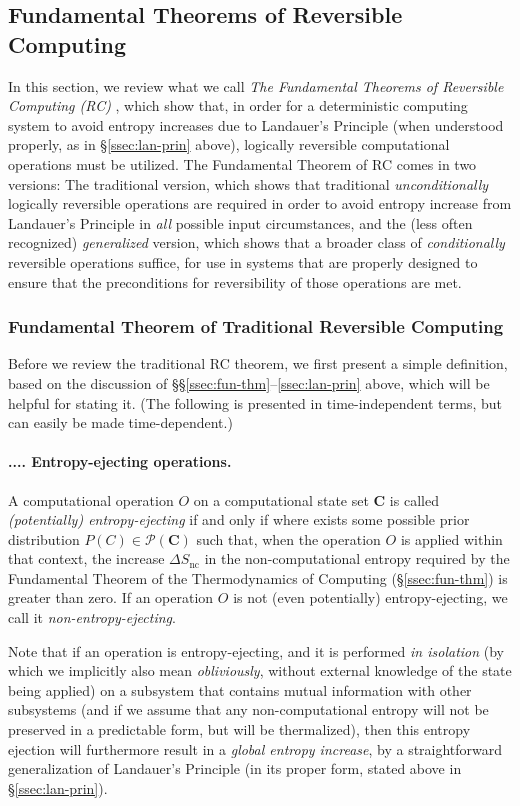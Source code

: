 \documentclass[preprints,article,accept,moreauthors,pdftex]{Definitions/mdpi}
\newcommand{\mypara}[1]{\paragraph{\arabic{section}.\arabic{subsection}.\arabic{subsubsection}.\arabic{paragraph}. #1}}
\begin{document}
\begin{paracol}{2}
\subsection{Fundamental Theorems of Reversible Computing}
\label{ssec:rc-thms}

In this section, we review what we call \emph{The Fundamental Theorems of Reversible Computing (RC)} \cite{Fra17a}, which show that, in order for a deterministic computing system to avoid entropy increases due to Landauer's Principle (when understood properly, as in \S\ref{ssec:lan-prin} above), logically reversible computational operations must be utilized. The Fundamental Theorem of RC comes in two versions: The traditional version, which shows that traditional \emph{unconditionally} logically reversible operations are required in order to avoid entropy increase from Landauer's Principle in \emph{all} possible input circumstances, and the (less often recognized) \emph{generalized} version, which shows that a broader class of \emph{conditionally} reversible operations suffice, for use in systems that are properly designed to ensure that the preconditions for reversibility of those operations are met. 

\subsubsection{Fundamental Theorem of Traditional Reversible Computing}
\label{sssec:trad-rc}

Before we review the traditional RC theorem, we first present a simple definition, based on the discussion of \S\S\ref{ssec:fun-thm}--\ref{ssec:lan-prin} above, which will be helpful for stating it. (The following is presented in time-independent terms, but can easily be made time-dependent.)

\mypara{Entropy-ejecting operations.}\label{par:ent-ej-ops}

A computational operation $O$ on a computational state set $\mathbf{C}$ is called \emph{(potentially) entropy-ejecting} if and only if where exists some possible prior distribution $P(C)\in\mathcal{P}(\mathbf{C})$ such that, when the operation $O$ is applied within that context, the increase $\Delta S_\mathrm{nc}$ in the non-computational entropy required by the Fundamental Theorem of the Thermodynamics of Computing (\S\ref{ssec:fun-thm}) is greater than zero. If an operation $O$ is not (even potentially) entropy-ejecting, we call it \emph{non-entropy-ejecting}.

Note that if an operation is entropy-ejecting, and it is performed \emph{in isolation} (by which we implicitly also mean \textit{obliviously}, without external knowledge of the state being applied) on a subsystem that contains mutual information with other subsystems (and if we assume that any non-computational entropy will not be preserved in a predictable form, but will be thermalized), then this entropy ejection will furthermore result in a \emph{global entropy increase}, by a straightforward generalization of Landauer's Principle (in its proper form, stated above in \S\ref{ssec:lan-prin}).


\end{paracol}
\end{document}
